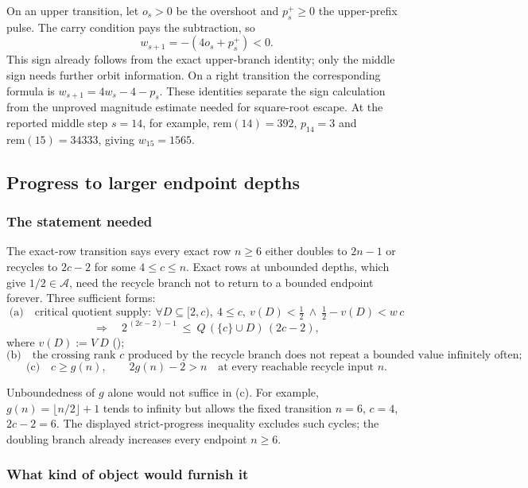 On an upper transition, let $o_s>0$ be the overshoot and $p_s^+\ge0$
the upper-prefix pulse.  The carry condition pays the subtraction,
so
\[
 w_{s+1}=-(4o_s+p_s^+)<0.
\]
This sign already follows from the exact upper-branch identity;
only the middle sign needs further orbit information.  On a right
transition the corresponding formula is
$w_{s+1}=4w_s-4-p_s$.
These identities separate the
sign calculation from the unproved magnitude estimate needed for square-root escape.  At the
reported middle step $s=14$, for example,
$\mathrm{rem}(14)=392$, $p_{14}=3$ and
$\mathrm{rem}(15)=34333$, giving $w_{15}=1565$.

\subsection{Progress to larger endpoint depths}
\label{sec:invent-R2}

\subsubsection*{The statement needed}

The exact-row transition
says every exact row $n\ge6$ either doubles to $2n-1$ or recycles to $2c-2$ for some
$4\le c\le n$.  Exact rows at unbounded depths, which give $1/2\in\mathcal A$, need the recycle
branch not to return to a bounded endpoint forever. Three sufficient forms:
\[
\text{(a)}\quad
\text{critical quotient supply}:\ \forall D\subseteq[2,c),\ 4\le c,\
v(D)<\tfrac12\ \wedge\ \tfrac12-v(D)<\ensuremath{w}\,c
\]
\[
\Longrightarrow\quad 2^{\,(2c-2)-1}\ \le\ \ensuremath{Q}\,(\{c\}\cup D)\,(2c-2),
\]
where $v(D):=\ensuremath{V}\ D$
();
\[
\text{(b)}\quad
\text{the crossing rank } c \text{ produced by the recycle branch does not repeat a bounded value infinitely often};
\]
\[
\text{(c)}\quad
c\ge g(n),\qquad 2g(n)-2>n
\quad\text{at every reachable recycle input }n.
\]

Unboundedness of $g$ alone would not suffice in (c).  For example,
$g(n)=\lfloor n/2\rfloor+1$ tends to infinity but allows the fixed
transition $n=6$, $c=4$, $2c-2=6$.  The displayed strict-progress
inequality excludes such cycles; the doubling branch already
increases every endpoint $n\ge6$.

\subsubsection*{What kind of object would furnish it}

